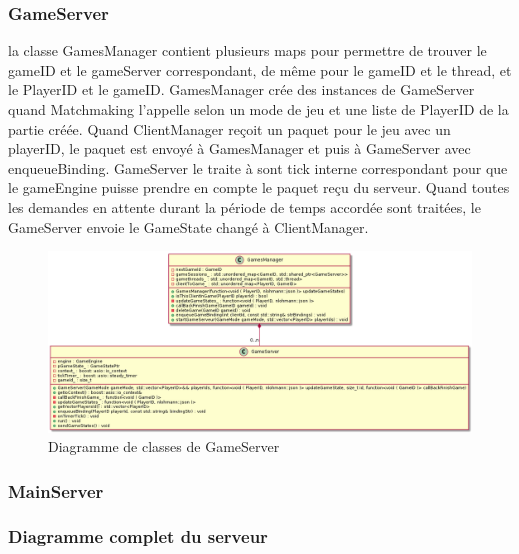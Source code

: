 \documentclass{article}
\begin{document}
\subsubsection{GameServer}

la classe GamesManager contient plusieurs maps pour permettre de trouver le gameID et le gameServer correspondant, de même pour le gameID et le thread, et le PlayerID et le gameID. GamesManager crée des instances de GameServer quand Matchmaking l'appelle selon un mode de jeu et une liste de PlayerID de la partie créée. Quand ClientManager reçoit un paquet pour le jeu avec un playerID, le paquet est envoyé à GamesManager et puis à GameServer avec enqueueBinding. GameServer le traite à sont tick interne correspondant pour que le gameEngine puisse prendre en compte le paquet reçu du serveur. Quand toutes les demandes en attente durant la période de temps accordée sont traitées, le GameServer envoie le GameState changé à ClientManager. 

\begin{figure}[H]
	\centering
	 \includegraphics[scale=0.4]{../res/uml/class/GameServerClass.png}
	 \caption{Diagramme de classes de GameServer}
	 \label{fig:GameServerDiagram}
\end{figure}

\subsubsection{MainServer}


\subsubsection{Diagramme complet du serveur}
\end{document}
